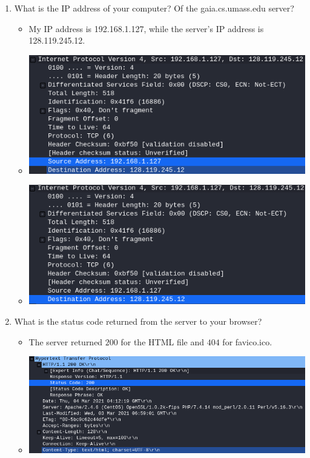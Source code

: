 \documentclass[11pt]{article}
\begin{document}
\begin{enumerate}
\begin{itemize}
  \end{itemize}
\item What is the IP address of your computer?  Of the gaia.cs.umass.edu server?
  \begin{itemize}
  \item My IP address is 192.168.1.127, while the server's IP address is
    128.119.245.12.
  \item \includegraphics[width=\textwidth]{img/ws-my-ip}
  \item \includegraphics[width=\textwidth]{img/ws-server-ip}
  \end{itemize}
\item What is the status code returned from the server to your browser?
  \begin{itemize}
  \item The server returned $200$ for the HTML file and $404$ for favico.ico.
  \item \includegraphics[width=\textwidth]{img/ws-status-code-1}

\end{itemize}
\end{enumerate}
\end{document}
